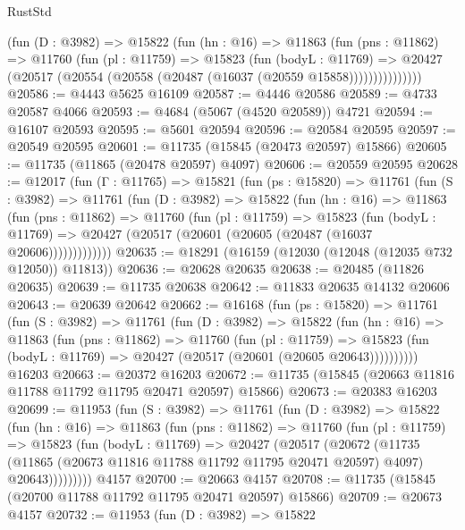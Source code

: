 \begin{lexlean}{RustStd}
\begin{coremodule}
            (fun (D : @3982) =>
            @15822
              (fun (hn : @16) =>
              @11863
                (fun (pns : @11862) =>
                @11760
                  (fun (pl : @11759) =>
                  @15823
                    (fun (bodyL : @11769) =>
                    @20427 (@20517 (@20554 (@20558 (@20487 (@16037 (@20559 @15858)))))))))))))))
@20586 := @4443 @5625 @16109
@20587 := @4446 @20586
@20589 := @4733 @20587 @4066
@20593 := @4684 (@5067 (@4520 @20589)) @4721
@20594 := @16107 @20593
@20595 := @5601 @20594
@20596 := @20584 @20595
@20597 := @20549 @20595
@20601 := @11735 (@15845 (@20473 @20597) @15866)
@20605 := @11735 (@11865 (@20478 @20597) @4097)
@20606 := @20559 @20595
@20628 := @12017
    (fun (Γ : @11765) =>
    @15821
      (fun (ps : @15820) =>
      @11761
        (fun (S : @3982) =>
        @11761
          (fun (D : @3982) =>
          @15822
            (fun (hn : @16) =>
            @11863
              (fun (pns : @11862) =>
              @11760
                (fun (pl : @11759) =>
                @15823
                  (fun (bodyL : @11769) =>
                  @20427 (@20517 (@20601 (@20605 (@20487 (@16037 @20606)))))))))))))
@20635 := @18291 (@16159 (@12030 (@12048 (@12035 @732 @12050)) @11813))
@20636 := @20628 @20635
@20638 := @20485 (@11826 @20635)
@20639 := @11735 @20638
@20642 := @11833 @20635 @14132 @20606
@20643 := @20639 @20642
@20662 := @16168
    (fun (ps : @15820) =>
    @11761
      (fun (S : @3982) =>
      @11761
        (fun (D : @3982) =>
        @15822
          (fun (hn : @16) =>
          @11863
            (fun (pns : @11862) =>
            @11760
              (fun (pl : @11759) =>
              @15823 (fun (bodyL : @11769) => @20427 (@20517 (@20601 (@20605 @20643))))))))))
    @16203
@20663 := @20372 @16203
@20672 := @11735 (@15845 (@20663 @11816 @11788 @11792 @11795 @20471 @20597) @15866)
@20673 := @20383 @16203
@20699 := @11953
    (fun (S : @3982) =>
    @11761
      (fun (D : @3982) =>
      @15822
        (fun (hn : @16) =>
        @11863
          (fun (pns : @11862) =>
          @11760
            (fun (pl : @11759) =>
            @15823
              (fun (bodyL : @11769) =>
              @20427
                (@20517
                  (@20672
                    (@11735
                      (@11865 (@20673 @11816 @11788 @11792 @11795 @20471 @20597) @4097)
                      @20643)))))))))
    @4157
@20700 := @20663 @4157
@20708 := @11735 (@15845 (@20700 @11788 @11792 @11795 @20471 @20597) @15866)
@20709 := @20673 @4157
@20732 := @11953
    (fun (D : @3982) =>
    @15822

\end{coremodule}
\end{lexlean}
